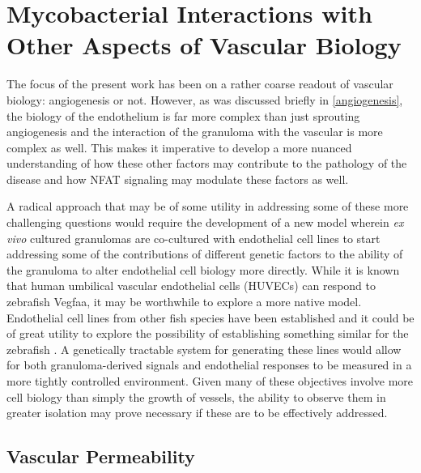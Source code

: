 \section{Mycobacterial Interactions with Other Aspects of Vascular Biology}

The focus of the present work has been on a rather coarse readout of vascular biology: angiogenesis or not. However, as was discussed briefly in \autoref{angiogenesis}, the biology of the endothelium is far more complex than just sprouting angiogenesis and the interaction of the granuloma with the vascular is more complex as well. This makes it imperative to develop a more nuanced understanding of how these other factors may contribute to the pathology of the disease and how NFAT signaling may modulate these factors as well. 

A radical approach that may be of some utility in addressing some of these more challenging questions would require the development of a new model wherein \textit{ex vivo} cultured granulomas are co-cultured with endothelial cell lines to start addressing some of the contributions of different genetic factors to the ability of the granuloma to alter endothelial cell biology more directly. While it is known that human umbilical vascular endothelial cells (HUVECs) can respond to zebrafish Vegfaa, it may be worthwhile to explore a more native model. Endothelial cell lines from other fish species have been established and it could be of great utility to explore the possibility of establishing something similar for the zebrafish \citep{Pham2017, Luque2014}. A genetically tractable system for generating these lines would allow for both granuloma-derived signals and endothelial responses to be measured in a more tightly controlled environment. Given many of these objectives involve more cell biology than simply the growth of vessels, the ability to observe them in greater isolation may prove necessary if these are to be effectively addressed.

\subsection{Vascular Permeability}

\citep{Akwii2021, Augustin2009, Huang2010, ParkWindhol2016, Saharinen2017, Thurston2012}
\citep{ClaessonWelsh2015}
\citep{Eklund2017}
\citep{Hato2008}

